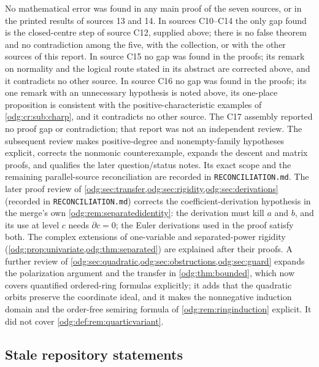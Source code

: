 \documentclass[11pt,oneside]{article}
\numberwithin{equation}{section}
\theoremstyle{definition}
\theoremstyle{remark}
\newcommand{\fn}[1]{\nolinkurl{#1}}
\begin{document}
No mathematical error was found in any main proof of the seven sources, or in
the printed results of sources 13 and 14. In sources C10--C14 the only gap found is
the closed-centre step of source C12, supplied above; there is no false theorem and
no contradiction among the five, with the collection, or with the other sources of this
report. In source C15 no gap was found in the proofs; its remark on normality and the
logical route stated in its abstract are corrected above, and it contradicts no other
source. In source C16 no gap was found in the proofs; its one remark with an
unnecessary hypothesis is noted above, its one-place proposition is consistent with the
positive-characteristic examples of \cref{odg:cr:sub:charp}, and it contradicts no other
source. The C17 assembly reported no proof gap or contradiction; that report was not an
independent review. The subsequent review makes positive-degree and nonempty-family
hypotheses explicit, corrects the nonmonic counterexample, expands the descent and
matrix proofs, and qualifies the later question/status notes. Its exact scope and the
remaining parallel-source reconciliation are recorded in \fn{RECONCILIATION.md}.
The later proof review of
\cref{odg:sec:transfer,odg:sec:rigidity,odg:sec:derivations} (recorded in
\fn{RECONCILIATION.md}) corrects the coefficient-derivation hypothesis in the
merge's own \cref{odg:rem:separatedidentity}: the derivation must kill $a$
and $b$, and its use at level $c$ needs $\partial c=0$; the Euler derivations
used in the proof satisfy both. The complex extensions of one-variable and
separated-power rigidity (\cref{odg:prop:univariate,odg:thm:separated}) are
explained after their proofs. A further review of
\cref{odg:sec:quadratic,odg:sec:obstructions,odg:sec:guard} expands the
polarization argument and the transfer in \cref{odg:thm:bounded}, which now
covers quantified ordered-ring formulas explicitly; it adds that the quadratic
orbits preserve the coordinate ideal, and it makes the nonnegative induction
domain and the order-free semiring formula of \cref{odg:rem:ringinduction}
explicit. It did not cover \cref{odg:def:rem:quarticvariant}.

\subsection{Stale repository statements}
\end{document}
